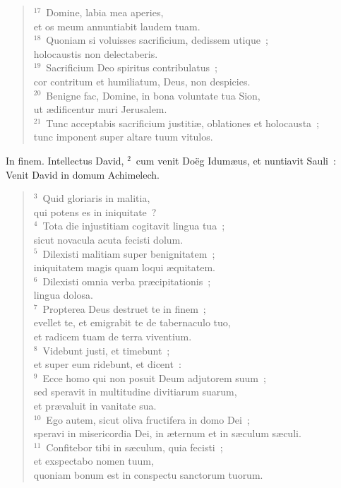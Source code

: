 \begin{flushleft}
\begin{verse}
${}^{17}$~Domine, labia mea aperies,\\ et os meum annuntiabit laudem tuam.\\
${}^{18}$~Quoniam si voluisses sacrificium, dedissem utique~;\\ holocaustis non delectaberis.\\
${}^{19}$~Sacrificium Deo spiritus contribulatus~;\\ cor contritum et humiliatum, Deus, non despicies.\\
${}^{20}$~Benigne fac, Domine, in bona voluntate tua Sion,\\ ut \ae dificentur muri Jerusalem.\\
${}^{21}$~Tunc acceptabis sacrificium justiti\ae , oblationes et holocausta~;\\ tunc imponent super altare tuum vitulos.\end{verse}\end{flushleft}



\lettrine[lines=3,image=true,loversize=0.05,lraise=-0.03]{I}{}n finem. Intellectus David,
${}^{2}$~cum venit Do\"eg Idum\ae us, et nuntiavit Sauli~: Venit David in domum Achimelech.
\begin{flushleft}\begin{verse}${}^{3}$~Quid gloriaris in malitia,\\ qui potens es in iniquitate~?\\
${}^{4}$~Tota die injustitiam cogitavit lingua tua~;\\ sicut novacula acuta fecisti dolum.\\
${}^{5}$~Dilexisti malitiam super benignitatem~;\\ iniquitatem magis quam loqui \ae quitatem.\\
${}^{6}$~Dilexisti omnia verba pr\ae cipitationis~;\\ lingua dolosa.\\
${}^{7}$~Propterea Deus destruet te in finem~;\\ evellet te, et emigrabit te de tabernaculo tuo,\\ et radicem tuam de terra viventium.\\
${}^{8}$~Videbunt justi, et timebunt~;\\ et super eum ridebunt, et dicent~:\\
${}^{9}$~Ecce homo qui non posuit Deum adjutorem suum~;\\ sed speravit in multitudine divitiarum suarum,\\ et pr\ae valuit in vanitate sua.\\
${}^{10}$~Ego autem, sicut oliva fructifera in domo Dei~;\\ speravi in misericordia Dei, in \ae ternum et in s\ae culum s\ae culi.\\
${}^{11}$~Confitebor tibi in s\ae culum, quia fecisti~;\\ et exspectabo nomen tuum,\\ quoniam bonum est in conspectu sanctorum tuorum.\end{verse}\end{flushleft}



